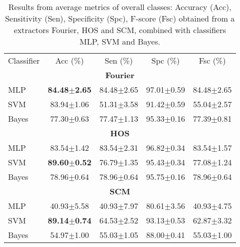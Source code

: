 \documentclass[review]{elsarticle}
\begin{document}
\begin{table}[!htb]
\caption{Results from average metrics of overall classes: Accuracy (Acc), Sensitivity (Sen),  Specificity (Spc), F-score (Fsc) obtained from a extractors Fourier, HOS and SCM, combined with classifiers MLP, SVM and Bayes.}
\centering

\begin{tabular}{lcccc}
\toprule
\multirow{2}{*}{Classifier}    & \multirow{2}{*}{Acc (\%)}   & \multirow{2}{*}{Sen (\%)}  & \multirow{2}{*}{Spc (\%)}  & \multirow{2}{*}{Fsc (\%)}         \\ 
                      \\ \hline \hline 

\multicolumn{5}{c}{\textbf{Fourier}}                                                                                  \\ \hline
MLP      & \textbf{84.48$\pm$2.65} & 84.48$\pm$2.65 & 97.01$\pm$0.59 & 84.48$\pm$2.65 \\  
SVM        & 83.94$\pm$1.06 & 51.31$\pm$3.58 & 91.42$\pm$0.59  & 55.04$\pm$2.57\\
Bayes        & 77.30$\pm$0.63 & 77.47$\pm$1.13 & 95.33$\pm$0.16  & 77.39$\pm$0.81 \\
\hline \hline

\multicolumn{5}{c}{\textbf{HOS}}                                                                                  \\ \hline           
MLP      & 83.54$\pm$1.42 & 83.54$\pm$2.31 & 96.82$\pm$0.34 & 83.54$\pm$1.57 \\  
SVM        & \textbf{89.60$\pm$0.52} & 76.79$\pm$1.35  & 95.43$\pm$0.34  & 77.08$\pm$1.24\\
Bayes        & 78.96$\pm$0.64 & 78.96$\pm$0.64  & 95.75$\pm$0.16  & 78.96$\pm$0.64\\
\hline \hline


\multicolumn{5}{c}{\textbf{SCM}}                                                                                  \\ \hline
MLP      & 40.93$\pm$5.58 & 40.93$\pm$7.97  & 80.61$\pm$3.56  & 40.93$\pm$4.75 \\  
SVM        & \textbf{89.14$\pm$0.74} & 64.53$\pm$2.52  & 93.13$\pm$0.53  & 62.87$\pm$3.32 \\
Bayes        & 54.97$\pm$1.00 & 55.03$\pm$1.05  & 88.00$\pm$0.41  & 55.03$\pm$1.00 \\
\hline \hline

\bottomrule
\end{tabular}
\label{tab:clf_all}
\end{table}
\end{document}
